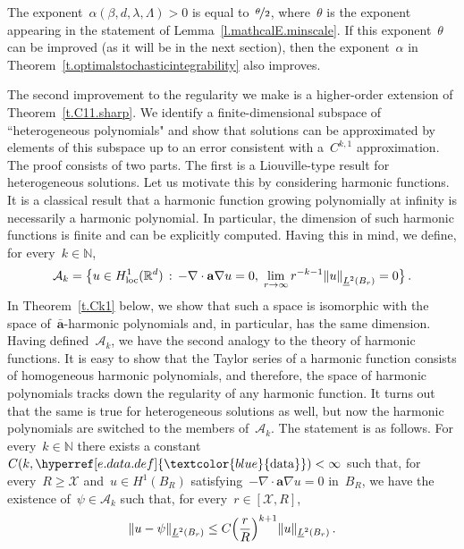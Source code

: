 \documentclass[11pt,twoside]{article} %
\numberwithin{equation}{section}
\theoremstyle{definition}
\newcommand{\dataref}{\hyperref[e.data.def]{\textcolor{blue}{\ensuremath{\mathrm{data}}}}}
\let\originalleft\left
\let\originalright\right
\renewcommand{\left}{\mathopen{}\mathclose\bgroup\originalleft}
\renewcommand{\right}{\aftergroup\egroup\originalright}
\newcommand*{\N}{\ensuremath{\mathbb{N}}}
\newcommand*{\R}{\ensuremath{\mathbb{R}}}
\renewcommand{\a}{\mathbf{a}}
\newcommand{\ahom}{\bar{\a}}
\newcommand{\X}{\mathcal{X}}
\begin{document}
The exponent~$\alpha(\beta,d,\lambda,\Lambda)>0$ is equal to~$\nicefrac \theta 2$, where~$\theta$ is the exponent appearing in the statement of Lemma~\ref{l.mathcalE.minscale}. If this exponent~$\theta$ can be improved (as it will be in the next section), then the exponent~$\alpha$ in Theorem~\ref{t.optimalstochasticintegrability} also improves. 

\smallskip

The second improvement to the regularity we make is a higher-order extension of  Theorem~\ref{t.C11.sharp}. We identify a finite-dimensional subspace of ``heterogeneous polynomials" and show that solutions can be approximated by elements of this subspace up to an error consistent with a~$C^{k,1}$ approximation. The proof consists of two parts. The first is a Liouville-type result for heterogeneous solutions. Let us motivate this by considering harmonic functions. It is a classical result that a harmonic function growing polynomially at infinity is necessarily a harmonic polynomial. In particular, the dimension of such harmonic functions is finite and can be explicitly computed. Having this in mind, we define, for every~$k \in \N$, 
\begin{equation}  
\label{e.Ak.def}
\mathcal{A}_k  = \big\{ u \in H^1_{\mathrm{loc}}(\R^d) \, : \, -\nabla \cdot \a \nabla u = 0, \; \lim_{r\to \infty} r^{-k-1} \left\| u \right\|_{\underline{L}^2 \left( B_{r} \right)} = 0  \big\} \,.
\end{equation}
In Theorem~\ref{t.Ck1} below, we show that such a space is isomorphic with the space of~$\ahom$-harmonic polynomials and, in particular, has the same dimension. Having defined~$\mathcal{A}_k$, we have the second analogy to the theory of harmonic functions. It is easy to show that the Taylor series of a harmonic function consists of homogeneous harmonic polynomials, and therefore, the space of harmonic polynomials tracks down the regularity of any harmonic function. It turns out that the same is true for heterogeneous solutions as well, but now the harmonic polynomials are switched to the members of~$\mathcal{A}_k$. The statement is as follows. For every~$k \in \N$ there exists a constant~$C(k,\dataref)<\infty$ such that, for every~$R\geq \X$ and~$u\in H^1(B_R)$ satisfying~$-\nabla \cdot \a\nabla u = 0$ in~$B_R$, we have the existence of~$\psi \in \mathcal{A}_k$ such that, for every~$r \in [\X,R]$, 
\begin{equation*}  
\| u - \psi \|_{\underline{L}^2(B_r)} \leq C \Bigl(\frac rR \Bigr)^{k+1} \| u \|_{\underline{L}^2(B_r)}  \,.
\end{equation*}
\end{document}
